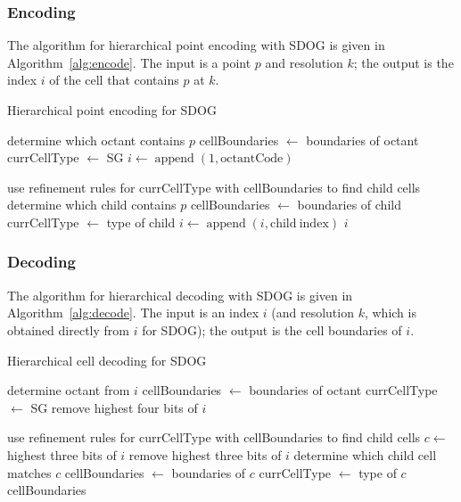 \subsubsection{Encoding}
The algorithm for hierarchical point encoding with SDOG is given in Algorithm~\ref{alg:encode}.
The input is a point $p$ and resolution $k$; the output is the index $i$ of the cell that contains $p$ at $k$.


\begin{algorithm}
	\caption{Hierarchical point encoding for SDOG}
	
	\begin{algorithmic}
		
		\STATE determine which octant contains $p$
		\STATE cellBoundaries $\leftarrow$ boundaries of octant
		\STATE currCellType $\leftarrow$ SG
		\STATE $i \leftarrow \operatorname{append}(1, \mathrm{octantCode})$
		
		\STATE use refinement rules for currCellType with cellBoundaries to find child cells
		\STATE determine which child contains $p$
		\STATE cellBoundaries $\leftarrow$ boundaries of child
		\STATE currCellType $\leftarrow$ type of child
		\STATE $i \leftarrow \operatorname{append}(i, \mathrm{child~index})$
		\ENDFOR
		\RETURN $i$
		
	\end{algorithmic}
	\label{alg:encode}
\end{algorithm}


\subsubsection{Decoding}
The algorithm for hierarchical decoding with SDOG is given in Algorithm~\ref{alg:decode}.
The input is an index $i$ (and resolution $k$, which is obtained directly from $i$ for SDOG); the output is the cell boundaries of $i$.


\begin{algorithm}
	\caption{Hierarchical cell decoding for SDOG}
	
	\begin{algorithmic}
		
		\STATE determine octant from $i$
		\STATE cellBoundaries $\leftarrow$ boundaries of octant
		\STATE currCellType $\leftarrow$ SG
		\STATE remove highest four bits of $i$
		
		\FOR{$k$ iterations}
		\STATE use refinement rules for currCellType with cellBoundaries to find child cells
		\STATE $c \leftarrow$ highest three bits of $i$
		\STATE remove highest three bits of $i$
		\STATE determine which child cell matches $c$
		\STATE cellBoundaries $\leftarrow$ boundaries of $c$
		\STATE currCellType $\leftarrow$ type of $c$
		\ENDFOR
		\RETURN cellBoundaries
		
	\end{algorithmic}
	\label{alg:decode}
\end{algorithm}


